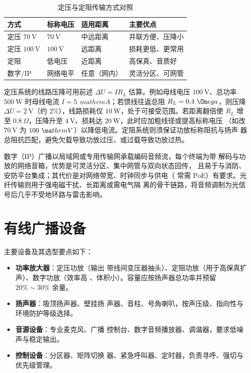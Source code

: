\begin{table}[htbp]
\centering
\caption{定压与定阻传输方式对照}
\label{tab:wired_mode}
\begin{tabular}{|p{2.6cm}|p{3.6cm}|p{4.0cm}|p{3.0cm}|}
\hline
\textbf{方式} & \textbf{标称电压} & \textbf{适用距离} & \textbf{主要优点} \\
\hline
定压 $70\ \mathrm{V}$ & $70\ \mathrm{V}$ & 中远距离 & 并联方便、压降小 \\
\hline
定压 $100\ \mathrm{V}$ & $100\ \mathrm{V}$ & 远距离 & 损耗更低、更常用 \\
\hline
定阻 & 低电压 & 近距离 & 高保真、音质好 \\
\hline
数字/IP & 网络电平 & 任意（网内） & 灵活分区、可网管 \\
\hline
\end{tabular}
\end{table}

定压系统的线路压降可用前述 $\Delta U = I R_L$
 估算。例如母线电压 $100\ \mathrm{V}$、总功率
 $500\ \mathrm{W}$ 时母线电流 $I=5\ \
mathrm{A}$；若馈线往返总阻 $R_L=0.4\ \Om
ega$，则压降 $\Delta U=2\ \mathrm{V}
$（约 $2\%$），线路损耗仅 $10\ \mathrm{W}
$，处于可接受范围。若距离翻倍使 $R_L$ 增至 $0.8\ 
\Omega$，压降升至 $4\ \mathrm{V}$、损耗达
 $20\ \mathrm{W}$，此时应加粗线径或提高标称电压
（如改 $70\ \mathrm{V}$ 为 $100\ \ma
thrm{V}$）以降低电流。定阻系统则须保证功放标称阻抗与扬声
器总阻抗匹配，避免欠载导致功放过压、或过载导致功放过热。

数字（IP）广播以局域网或专用传输网承载编码音频流，每个终端为带
解码与功放的网络音箱，优势是可灵活分区、集中网管与双向状态回传，
且易于与消防、安防平台集成；其代价是对网络带宽、时钟同步与供电（
常需 PoE）有要求。光纤传输则用于强电磁干扰、长距离或需电气隔
离的骨干链路，将音频调制为光信号后几乎不受地环路与雷击影响。

\section{有线广播设备}
\label{sec:wired_broadcast_equipment}

主要设备及其选型要点如下：

\begin{itemize}
    \item \textbf{功率放大器}：定压功放（输出
带线间变压器抽头）、定阻功放（用于高保真扩声）、数字功放（效率高
、体积小）。容量应按扬声器总功率并预留 $20\%\sim 30
\%$ 余量。
    \item \textbf{扬声器}：吸顶扬声器、壁挂扬
声器、音柱、号角喇叭，按声压级、指向性与环境防护等级选择。
    \item \textbf{音源设备}：专业麦克风、广播
控制台、数字音频播放器、调谐器，要求低噪声与稳定输出。
    \item \textbf{控制设备}：分区器、矩阵切换
器、紧急呼叫器、定时器，负责寻呼、强切与优先级管理。
\end{itemize}

